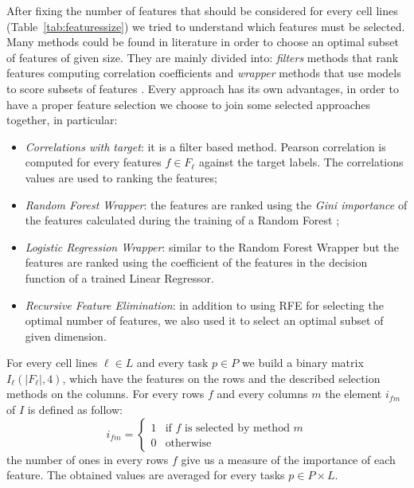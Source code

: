 After fixing the number of features that should be considered for every cell lines (Table~\ref{tab:featuressize}) we tried to understand which features must be selected. Many methods could be found in literature in order to choose an optimal subset of features of given size. They are mainly divided into: \emph{filters} methods that rank features computing correlation coefficients and \emph{wrapper} methods that use models to score subsets of features \cite{Guyon}. Every approach has its own advantages, in order to have a proper feature selection we choose to join some selected approaches together, in particular:
\begin{itemize}
    \item \textit{Correlations with target}: it is a filter based method. Pearson correlation is computed for every features $f \in F_\ell$ against the target labels. The correlations values are used to ranking the features;
    \item \textit{Random Forest Wrapper}: the features are ranked using the \emph{Gini importance} \cite{giniimportance} of the features calculated during the training of a Random Forest \cite{breiman2001random}; 
    \item \textit{Logistic Regression Wrapper}: similar to the Random Forest Wrapper but the features are ranked using the coefficient of the features in the decision function of a trained Linear Regressor.
    \item \emph{Recursive Feature Elimination}: in addition to using RFE for selecting the optimal number of features, we also used it to select an optimal subset of given dimension. 
\end{itemize}
For every cell lines $\ell \in L$ and every task $p \in P$ we build a binary matrix $I_\ell(|F_\ell|, 4)$, which have the features on the rows and the described selection methods on the columns. For every rows $f$ and every columns $m$ the element $i_{fm}$ of $I$ is defined as follow: 
\[
    i_{fm} = \begin{cases} 1 & \mbox{if } f \mbox{ is selected by method } m \\ 0 & \mbox{otherwise} \end{cases}
\]
the number of ones in every rows $f$ give us a measure of the importance of each feature. The obtained values are averaged for every tasks $p \in P \times L$. 

